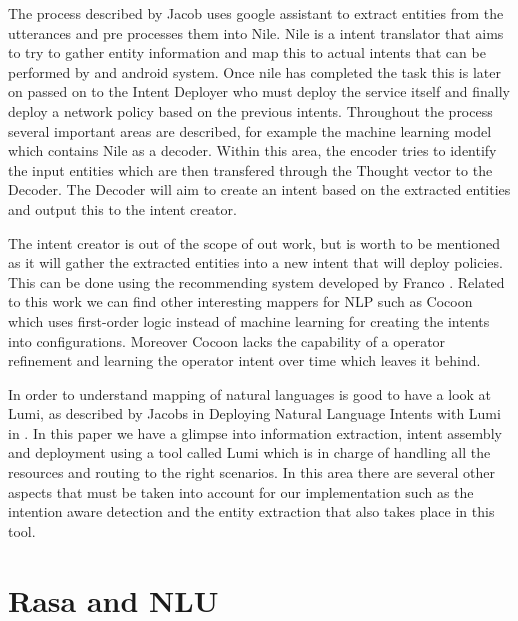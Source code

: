 The process described by Jacob uses google assistant to extract entities from the utterances and pre processes them into Nile. Nile is a intent translator that aims to try to gather entity information and map this to actual intents that can be performed by and android system. Once nile has completed the task this is later on passed on to the Intent Deployer who must deploy the service itself and finally deploy a network policy based on the previous intents. Throughout the process several important areas are described, for example the machine learning model which contains Nile as a decoder. Within this area, the encoder tries to identify the input entities which are then transfered through the Thought vector to the Decoder. The Decoder will aim to create an intent based on the extracted entities and output this to the intent creator.

The intent creator is out of the scope of out work, but is worth to be mentioned as it will gather the extracted entities into a new intent that will deploy policies. This can be done using the recommending system developed by Franco \cite{MENTOR}. Related to this work we can find other interesting mappers for NLP such as Cocoon which uses first-order logic instead of machine learning for creating the intents into configurations. Moreover Cocoon lacks the capability of a operator refinement and learning the operator intent over time which leaves it behind. 

In order to understand mapping of natural languages is good to have a look at Lumi, as described by Jacobs in Deploying Natural Language Intents with Lumi in \cite{networkIntents}. In this paper we have a glimpse into information extraction, intent assembly and deployment using a tool called Lumi which is in charge of handling all the resources and routing to the right scenarios. In this area there are several other aspects that must be taken into account for our implementation such as the intention aware detection and the entity extraction that also takes place in this tool.

\section{Rasa and NLU}

